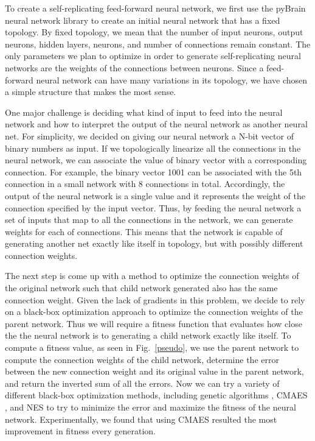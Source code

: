 \documentclass[12pt]{article}
\begin{document}
To create a self-replicating feed-forward neural network, we first use the pyBrain neural network library \cite{schaul2010} to create an initial neural network that has a fixed topology. By fixed topology, we mean that the number of input neurons, output neurons, hidden layers, neurons, and number of connections remain constant. The only parameters we plan to optimize in order to generate self-replicating neural networks are  the weights of the connections between neurons. Since a feed-forward neural network can have many variations in its topology, we have chosen a simple structure that makes the most sense. 

One major challenge is deciding what kind of input to feed into the neural network and how to interpret the output of the neural network as another neural net. For simplicity, we decided on giving our neural network a N-bit vector of binary numbers as input. If we topologically linearize all the connections in the neural network, we can associate the value of binary vector with a corresponding connection. For example, the binary vector 1001 can be associated with the 5th connection in a small network with 8 connections in total. Accordingly, the output of the neural network is a single value and it represents the weight of the connection specified by the input vector. Thus, by feeding the neural network a set of inputs that map to all the connections in the network, we can generate weights for each of connections. This means that the network is capable of generating another net exactly like itself in topology, but with possibly different connection weights. 

The next step is come up with a method to optimize the connection weights of the original network such that child network generated also has the same connection weight. Given the lack of gradients in this problem, we decide to rely on a black-box optimization approach to optimize the connection weights of the parent network. Thus we will require a fitness function that evaluates how close the the neural network is to generating a child network exactly like itself. To compute a fitness value, as seen in Fig.~\ref{pseudo}, we use the parent network to compute the connection weights of the child network, determine the error between the new connection weight and its original value in the parent network, and return the inverted sum of all the errors. Now we can try a variety of different black-box optimization methods, including genetic algorithms \cite{deb2002fast}, CMAES \cite{hansen2003reducing}, and NES \cite{wierstra2008natural} to try to minimize the error and maximize the fitness of the neural network. Experimentally, we found that using CMAES resulted the most improvement in fitness every generation. 
\end{document}
